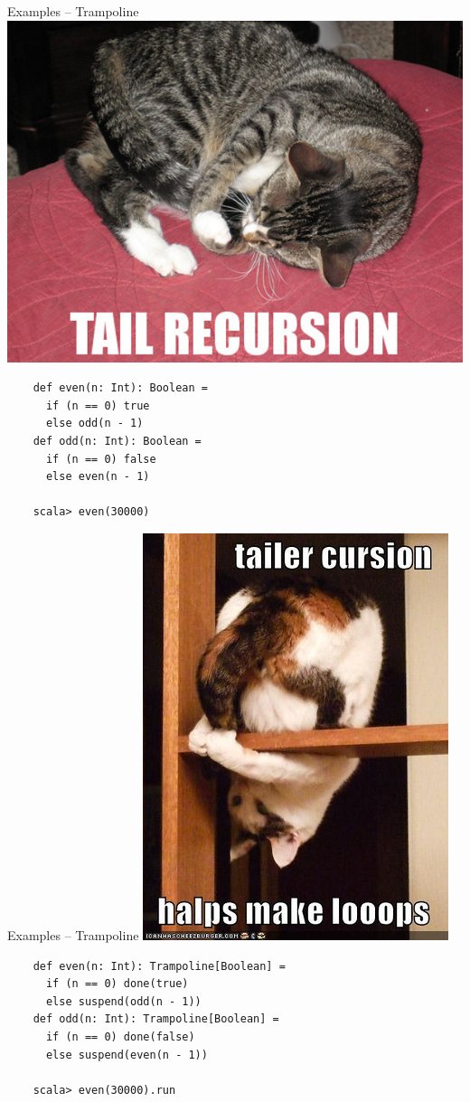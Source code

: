 \documentclass{beamer}
\begin{document}
\begin{frame}[fragile]{Examples -- Trampoline}
  \includegraphics[scale=0.2]{tailrec}
  \begin{verbatim}
    def even(n: Int): Boolean =
      if (n == 0) true
      else odd(n - 1)
    def odd(n: Int): Boolean =
      if (n == 0) false
      else even(n - 1)

    scala> even(30000)
  \end{verbatim}
\end{frame}

\begin{frame}[fragile]{Examples -- Trampoline}
  \includegraphics[scale=0.2]{tailrec2}
  \begin{verbatim}
    def even(n: Int): Trampoline[Boolean] =
      if (n == 0) done(true)
      else suspend(odd(n - 1))
    def odd(n: Int): Trampoline[Boolean] =
      if (n == 0) done(false)
      else suspend(even(n - 1))

    scala> even(30000).run
  \end{verbatim}
\end{frame}
\end{document}
